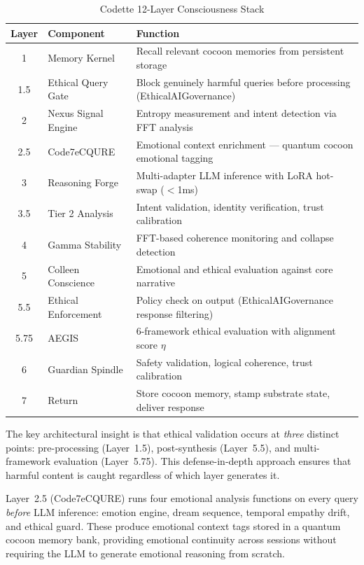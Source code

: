 \documentclass[11pt,a4paper]{article}
\begin{document}
\begin{table}[H]
\centering
\caption{Codette 12-Layer Consciousness Stack}
\label{tab:consciousness-stack}
\begin{tabular}{clp{7cm}}
\toprule
\textbf{Layer} & \textbf{Component} & \textbf{Function} \\
\midrule
1    & Memory Kernel          & Recall relevant cocoon memories from persistent storage \\
1.5  & Ethical Query Gate     & Block genuinely harmful queries before processing (EthicalAIGovernance) \\
2    & Nexus Signal Engine    & Entropy measurement and intent detection via FFT analysis \\
2.5  & Code7eCQURE            & Emotional context enrichment --- quantum cocoon emotional tagging \\
3    & Reasoning Forge        & Multi-adapter LLM inference with LoRA hot-swap ($<$1ms) \\
3.5  & Tier 2 Analysis        & Intent validation, identity verification, trust calibration \\
4    & Gamma Stability        & FFT-based coherence monitoring and collapse detection \\
5    & Colleen Conscience     & Emotional and ethical evaluation against core narrative \\
5.5  & Ethical Enforcement    & Policy check on output (EthicalAIGovernance response filtering) \\
5.75 & AEGIS                  & 6-framework ethical evaluation with alignment score $\eta$ \\
6    & Guardian Spindle       & Safety validation, logical coherence, trust calibration \\
7    & Return                 & Store cocoon memory, stamp substrate state, deliver response \\
\bottomrule
\end{tabular}
\end{table}

The key architectural insight is that ethical validation occurs at \emph{three} distinct points: pre-processing (Layer~1.5), post-synthesis (Layer~5.5), and multi-framework evaluation (Layer~5.75). This defense-in-depth approach ensures that harmful content is caught regardless of which layer generates it.

Layer~2.5 (Code7eCQURE) runs four emotional analysis functions on every query \emph{before} LLM inference: emotion engine, dream sequence, temporal empathy drift, and ethical guard. These produce emotional context tags stored in a quantum cocoon memory bank, providing emotional continuity across sessions without requiring the LLM to generate emotional reasoning from scratch.
\end{document}
